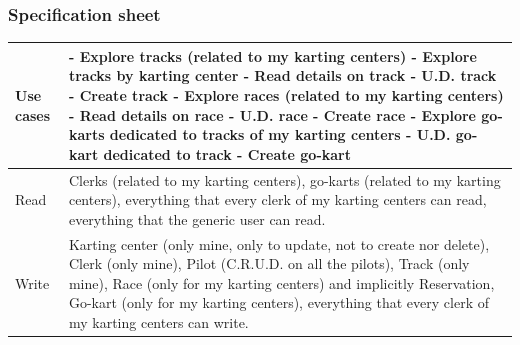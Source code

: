 \documentclass{beamer}
\begin{document}
\begin{frame}
\frametitle{Specification sheet}
\begin{table}
    \tiny
    \begin{tabular}{|p{2cm}|p{6cm}|}
    \hline
    Use cases &
    - Explore tracks (related to my karting centers)\newline
    - Explore tracks by karting center \newline
    - Read details on track \newline
    - U.D. track \newline
    - Create track \newline
    - Explore races (related to my karting centers) \newline
    - Read details on race \newline
    - U.D. race \newline
    - Create race \newline
    - Explore go-karts dedicated to tracks of my karting centers \newline
    - U.D. go-kart dedicated to track \newline
    - Create go-kart \\
    \hline
    Read & Clerks (related to my karting centers), go-karts (related to my karting centers), 
    everything that every clerk of my karting centers can read,
    everything that the generic user can read. \\
    \hline
    Write & Karting center (only mine, only to update, not to create nor delete), 
    Clerk (only mine), Pilot (C.R.U.D. on all the pilots), Track (only mine), Race (only for my karting centers) and implicitly Reservation, 
    Go-kart (only for my karting centers),
    everything that every clerk of my karting centers can write. \\
    \hline
    \end{tabular}
\end{table}
\end{frame}
\end{document}
